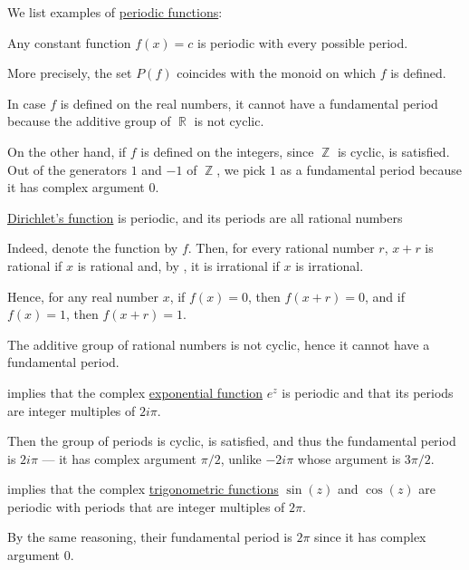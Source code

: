 \begin{example}\label{ex:def:periodic_function}
  We list examples of \hyperref[def:periodic_function]{periodic functions}:
  \begin{thmenum}
     Any constant function \( f(x) = c \) is periodic with every possible period.

    More precisely, the set \( P(f) \) coincides with the monoid on which \( f \) is defined.

    In case \( f \) is defined on the real numbers, it cannot have a fundamental period because the additive group of \( \BbbR \) is not cyclic.

    On the other hand, if \( f \) is defined on the integers, since \( \BbbZ \) is cyclic,  is satisfied. Out of the generators \( 1 \) and \( -1 \) of \( \BbbZ \), we pick \( 1 \) as a fundamental period because it has complex argument \( 0 \).

     \hyperref[def:dirichlet_function]{Dirichlet's function} is periodic, and its periods are all rational numbers

    Indeed, denote the function by \( f \). Then, for every rational number \( r \), \( x + r \) is rational if \( x \) is rational and, by , it is irrational if \( x \) is irrational.

    Hence, for any real number \( x \), if \( f(x) = 0 \), then \( f(x + r) = 0 \), and if \( f(x) = 1 \), then \( f(x + r) = 1 \).

    The additive group of rational numbers is not cyclic, hence it cannot have a fundamental period.

      implies that the complex \hyperref[def:exponential_function]{exponential function} \( e^z \) is periodic and that its periods are integer multiples of \( 2i\pi \).

    Then the group of periods is cyclic,  is satisfied, and thus the fundamental period is \( 2i\pi \) ---  it has complex argument \( \pi/2 \), unlike \( -2i\pi \) whose argument is \( 3\pi/2 \).

      implies that the complex \hyperref[def:trigonometric_functions]{trigonometric functions} \( \sin(z) \) and \( \cos(z) \) are periodic with periods that are integer multiples of \( 2\pi \).

    By the same reasoning, their fundamental period is \( 2\pi \) since it has complex argument \( 0 \).
  \end{thmenum}
\end{example}

